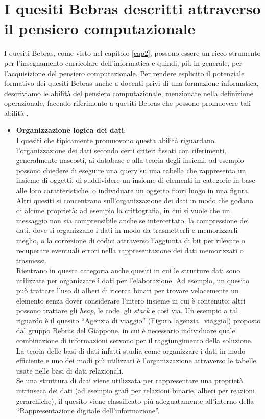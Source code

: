\documentclass[12pt]{report}
\begin{document}
\section{I quesiti Bebras descritti attraverso il pensiero computazionale} \label{ClassCT}
I quesiti Bebras, come visto nel capitolo \ref{cap2}, possono essere un ricco strumento per l'insegnamento curricolare dell'informatica e quindi, più in generale, per l'acquisizione del pensiero computazionale.
Per rendere esplicito il potenziale formativo dei quesiti Bebras anche a docenti privi di una formazione informatica, descriviamo le abilità del pensiero computazionale, menzionate nella definizione operazionale, facendo riferimento a quesiti Bebras che possono promuovere tali abilità \cite{LonatiISSEP2017}.

\begin{itemize}
	\item \textbf{Organizzazione logica dei dati}: 
	\\
	I quesiti che tipicamente promuovono questa abilità riguardano l'organizzazione dei dati secondo certi criteri fissati con riferimenti, generalmente nascosti, ai database e alla teoria degli insiemi: ad esempio possono chiedere di eseguire una query su una tabella che rappresenta un insieme di oggetti, di suddividere un insieme di elementi in categorie in base alle loro caratteristiche, o individuare un oggetto fuori luogo in una figura.
	\\
	Altri quesiti si concentrano sull'organizzazione dei dati in modo che godano di alcune proprietà: ad esempio la crittografia, in cui si vuole che un messaggio non sia comprensibile anche se intercettato, la compressione dei dati, dove si organizzano i dati in modo da trasmetterli e memorizzarli meglio, o la correzione di codici attraverso l'aggiunta di bit per rilevare o recuperare eventuali errori nella rappresentazione dei dati memorizzati o trasmessi.
	\\
	Rientrano in questa categoria anche quesiti in cui le strutture dati sono utilizzate per organizzare i dati per l'elaborazione. Ad esempio, un quesito può trattare l'uso di alberi di ricerca binari per trovare velocemente un elemento senza dover considerare l'intero insieme in cui è contenuto; altri possono trattare gli \textit{heap}, le code, gli \textit{stack} e così via. 
	Un esempio a tal riguardo è il quesito ``Agenzia di viaggio'' (Figura \ref{agenzia_viaggio}) proposto dal gruppo Bebras del Giappone, in cui è necessario individuare quale combinazione di informazioni servono per il raggiungimento della soluzione. La teoria delle basi di dati infatti studia come organizzare i dati in modo efficiente e uno dei modi più utilizzati è l'organizzazione attraverso le tabelle usate nelle basi di dati relazionali.
	\\
	Se una struttura di dati viene utilizzata per rappresentare una proprietà intrinseca dei dati (ad esempio grafi per relazioni binarie, alberi per reazioni gerarchiche), il quesito viene classificato più adeguatamente all'interno della ``Rappresentazione digitale dell'informazione''.
	

\end{itemize}
\end{document}
